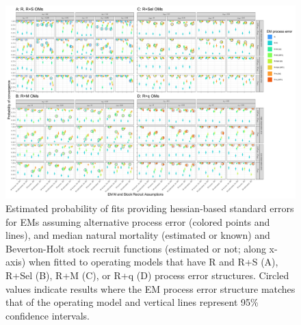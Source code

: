 \documentclass[
  12pt,
]{article}
\begin{document}
\begin{landscape}
\begin{figure}
\begin{center}
\includegraphics{type_4_convergence_plots}
\end{center}
\caption{Estimated probability of fits providing hessian-based standard errors for EMs assuming alternative process error (colored points and lines), and median natural mortality (estimated or known) and Beverton-Holt stock recruit functions (estimated or not; along x-axis) when fitted to operating models that have R and R+S (A), R+Sel (B), R+M (C), or R+q (D) process error structures. Circled values indicate results where the EM process error structure matches that of the operating model and vertical lines represent 95\% confidence intervals.}\label{hessian_SE_convergence}
\end{figure}
\end{landscape}

\clearpage
\end{document}

